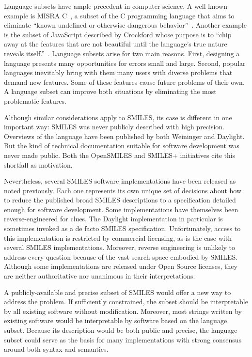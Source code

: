 \documentclass{article}
\begin{document}
Language subsets have ample precedent in computer science. A well-known example is MISRA C~\cite{misraC}, a subset of the C programming language that aims to eliminate \enquote{known undefined or otherwise dangerous behavior}~\cite{hatton:2007}. Another example is the subset of JavaScript described by Crockford whose purpose is to \enquote{chip away at the features that are not beautiful until the language's true nature reveals itself.}~\cite{crockford:2008}. Language subsets arise for two main reasons. First, designing a language presents many opportunities for errors small and large. Second, popular languages inevitably bring with them many users with diverse problems that demand new features. Some of these features cause future problems of their own. A language subset can improve both situations by eliminating the most problematic features.

Although similar considerations apply to SMILES, its case is different in one important way: SMILES was never publicly described with high precision. Overviews of the language have been published by both Weininger and Daylight. But the kind of technical documentation suitable for software development was never made public. Both the OpenSMILES and SMILES+ initiatives cite this shortfall as motivation.

Nevertheless, several SMILES software implementations have been released as noted previously. Each one represents its own unique set of decisions about how to reduce the published broad SMILES descriptions to a specification detailed enough for software development. Some implementations have themselves been reverse-engineered for clues. The Daylight implementation in particular is sometimes invoked as a de facto SMILES specification. Unfortunately, access to this implementation is restricted by commercial licensing, as is the case with several SMILES implementations. Moreover, reverse engineering is unlikely to address every question because of the vast search space embodied by SMILES. Although some implementations are released under Open Source licenses, they are neither authoritative nor unanimous in their interpretations.

A publicly-available and precise subset of SMILES would offer a new way to address the problem. If sufficiently constrained, the subset should be interpretable by all existing software without modification. Moreover, most strings written by existing software would be interpretable by software based on the language subset. Because its description would be both public and precise, the language subset could serve as the basis for many implementations with strong consensus around both syntax and semantics.
\end{document}
